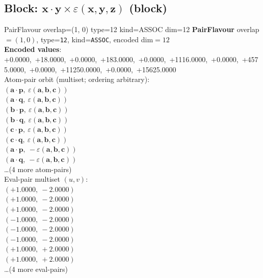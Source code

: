 \documentclass[a4paper,11pt]{article}
\newcommand{\pdcegfomjfhook}[2]{\mathbf{#1} \cdot \mathbf{#2}}
\newcommand{\kblbmcpggoncpf}[3]{\varepsilon(\mathbf{#1},\mathbf{#2},\mathbf{#3})}
\begin{document}
\subsection{Block: $\pdcegfomjfhook{x}{y} \times \kblbmcpggoncpf{x}{y}{z}$  (block)}
    PairFlavour  overlap=(1, 0)  type=12  kind=ASSOC  dim=12
\textbf{PairFlavour} overlap$=(1, 0)$, type=\texttt{12}, kind=\texttt{ASSOC}, encoded dim$=12$\\
\textbf{      Encoded values}: +0.0000,\ +18.0000,\ +0.0000,\ +183.0000,\ +0.0000,\ +1116.0000,\ +0.0000,\ +4575.0000,\ +0.0000,\ +11250.0000,\ +0.0000,\ +15625.0000\\
\quad Atom-pair orbit (multiset; ordering arbitrary):\\
$(\pdcegfomjfhook{a}{p},\ \kblbmcpggoncpf{a}{b}{c})$\\
$(\pdcegfomjfhook{a}{q},\ \kblbmcpggoncpf{a}{b}{c})$\\
$(\pdcegfomjfhook{b}{p},\ \kblbmcpggoncpf{a}{b}{c})$\\
$(\pdcegfomjfhook{b}{q},\ \kblbmcpggoncpf{a}{b}{c})$\\
$(\pdcegfomjfhook{c}{p},\ \kblbmcpggoncpf{a}{b}{c})$\\
$(\pdcegfomjfhook{c}{q},\ \kblbmcpggoncpf{a}{b}{c})$\\
$(\pdcegfomjfhook{a}{p},\ -\kblbmcpggoncpf{a}{b}{c})$\\
$(\pdcegfomjfhook{a}{q},\ -\kblbmcpggoncpf{a}{b}{c})$\\
\quad \ldots (4 more atom-pairs)\\
\quad Eval-pair multiset $(u, v)$:\\
$(+1.0000,\ -2.0000)$\\
$(+1.0000,\ -2.0000)$\\
$(+1.0000,\ -2.0000)$\\
$(-1.0000,\ -2.0000)$\\
$(-1.0000,\ -2.0000)$\\
$(-1.0000,\ -2.0000)$\\
$(+1.0000,\ +2.0000)$\\
$(+1.0000,\ +2.0000)$\\
\quad \ldots (4 more eval-pairs)\\
\end{document}
